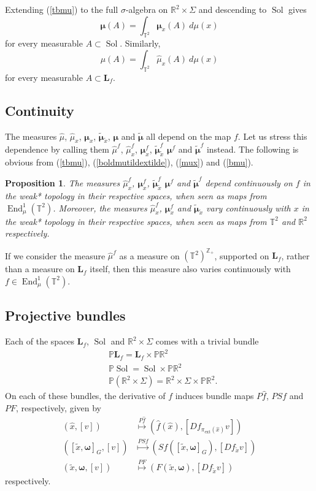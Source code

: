 \documentclass[11pt,letterpaper,reqno]{article}
\newtheorem{proposition}{Proposition}[section]
\newcommand{\Pp}{\mathbb P}
\newcommand{\Z}{\mathbb{Z}}
\newcommand{\TT}{\mathbb{T}^2}
\newcommand{\RR}{\mathbb{R}^2}
\newcommand{\hTTf}[1][f]{\mathbf{L}_{#1}}
\newcommand{\tx}{\tilde{x}}
\newcommand{\bomega}{\boldsymbol{\omega}}
\newcommand{\hf}{\hat{f}}
\newcommand{\bmu}{\boldsymbol{\mu}}
\newcommand{\hmu}{\hat{\mu}}
\newcommand{\hx}[1][x]{\hat{#1}}
\newcommand{\pext}{\pi_{\mathrm{ext}}}
\newcommand{\Sol}{\operatorname{Sol}}
\begin{document}
Extending (\ref{tbmu}) to the full $\sigma$-algebra on $\RR \times \Sigma$ and descending to $\Sol$ gives
\begin{equation} \label{bmu}
\bmu(A) = \int_{\TT} \bmu_x(A) \ d\mu(x)
\end{equation}
for every measurable $A \subset \Sol$. Similarly,
\begin{equation}
\mu(A) = \int_{\TT} \hmu_x(A) \ d\mu(x)
\end{equation}
for every measurable $A \subset \hTTf$.  

\subsection{Continuity}

The measures $\hmu$, $\hmu_x$, $\bmu_x$, $\tilde{\bmu}_{\tx}$, $\bmu$ and $\tilde{\bmu}$ all depend on the map $f$. Let us stress this dependence by calling them $\hmu^f$, $\hmu_x^f$, $\bmu_x^f$, $\tilde{\bmu}_{\tx}^f$ $\bmu^f$ and $\tilde{\bmu}^f$ instead. The following is obvious from (\ref{tbmu}),  (\ref{boldmutildextilde}), (\ref{mux}) and (\ref{bmu}).

\begin{proposition}\label{prop:a4}
The measures $\hmu_x^f$, $\bmu_x^f$, $\tilde{\bmu}_{\tx}^f$ $\bmu^f$ and $\tilde{\bmu}^f$ depend continuously on $f$ in the weak* topology in their respective spaces, when seen as maps from $\operatorname{End}_\mu^1(\TT)$. Moreover, the measures $\hmu_x^f$, $\bmu_x^f$ and $\tilde{\bmu}_{\tx}$ vary continuously with $x$ in the weak* topology in their respective spaces, when seen as maps from $\TT$ and $\RR$ respectively.
\end{proposition}

If we consider the measure $\hmu^f$ as a measure on $(\TT)^{\Z_+}$, supported on $\hTTf$, rather than a measure on $\hTTf$ itself, then this measure also varies continuously with $f \in \operatorname{End}_\mu^1(\TT)$.

 \subsection{Projective bundles}

 Each of the spaces $\hTTf$, $\Sol$ and $\RR \times \Sigma$ comes with a trivial bundle
 \begin{align*}
& \Pp \hTTf  = \hTTf \times \Pp \RR \\
& \Pp \Sol   = \Sol \times \Pp \RR \\
& \Pp (\RR \times \Sigma)  = \RR \times \Sigma \times \Pp \RR.
 \end{align*}
On each of these bundles, the derivative of $f$ induces bundle maps $P\hf$, $PSf$ and $PF$, respectively, given by
\begin{align*}
 (\hx, [v]) & \overset{P\hf}{\mapsto} (\hf(\hx), [Df_{\pext(\hx)} v]) \\
 ([\tx, \bomega]_G, [v]) & \overset{PSf}{\mapsto} (Sf ([\tx, \bomega]_G), [Df_{\tx} v]) \\
 (\tx, \bomega, [v]) & \overset{PF}{\mapsto} (F(\tx, \bomega), [Df_{\tx} v])
 \end{align*}
 respectively.
\end{document}
